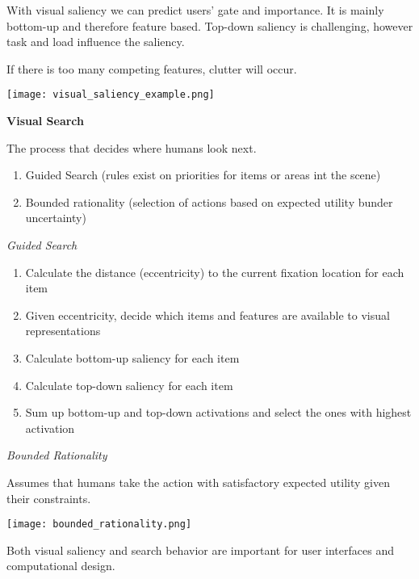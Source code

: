 With visual saliency we can predict users' gate and importance. It is mainly bottom-up and therefore feature based. Top-down saliency is challenging, however task and load influence the saliency. \medskip

If there is too many competing features, clutter will occur. \medskip


\begin{center}
	\texttt{[image: visual\_saliency\_example.png]}
\end{center}



\textbf{Visual Search} \smallskip

The process that decides where humans look next. 

\begin{enumerate}[itemsep=-5pt, topsep=0pt, leftmargin=*]
    \item Guided Search (rules exist on priorities for items or areas int the scene)
    \item Bounded rationality (selection of actions based on expected utility bunder uncertainty)
\end{enumerate}

\medskip

\textit{Guided Search} \smallskip

\begin{enumerate} [itemsep=-5pt, topsep=0pt, leftmargin=*]
    \item Calculate the distance (eccentricity) to the current fixation location for each item
    \item Given eccentricity, decide which items and features are available to visual representations
    \item Calculate bottom-up saliency for each item
    \item Calculate top-down saliency for each item
    \item Sum up bottom-up and top-down activations and select the ones with highest activation
\end{enumerate}

\textit{Bounded Rationality} \smallskip

Assumes that humans take the action with satisfactory expected utility given their constraints. 

\begin{center}
	\texttt{[image: bounded\_rationality.png]}
\end{center}

Both visual saliency and search behavior are important for user interfaces and computational design. \medskip

